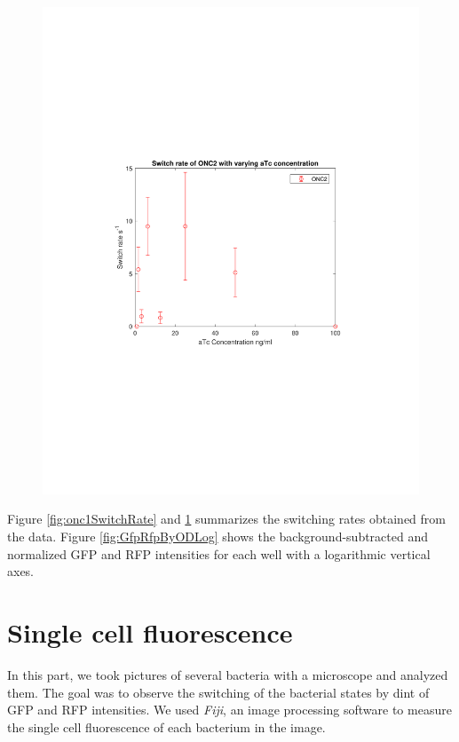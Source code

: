 \documentclass[english,11pt,a4paper]{article}
\begin{document}
\begin{figure}[htbp]
\centering
\includegraphics[scale=0.8]{ONC2switchrate.pdf}
\caption{}
\label{fig:onc2SwitchRate}
\end{figure}

Figure \ref{fig:onc1SwitchRate} and \ref{fig:onc2SwitchRate} summarizes the switching rates obtained from the data. Figure \ref{fig:GfpRfpByODLog} shows the background-subtracted and normalized GFP and RFP intensities for each well with a logarithmic vertical axes.

\pagebreak
\section{Single cell fluorescence}
In this part, we took pictures of several bacteria with a microscope and analyzed them. The goal was to observe the switching of the bacterial states by dint of  GFP and RFP intensities. We used \textit{Fiji}, an image processing software to measure the single cell fluorescence of each bacterium in the image. 
\end{document}
